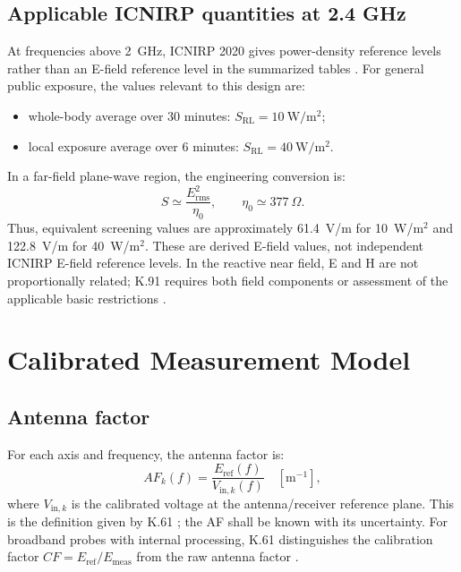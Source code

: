 \documentclass[11pt,a4paper]{article}
\begin{document}
\subsection{Applicable ICNIRP quantities at 2.4 GHz}
At frequencies above 2~GHz, ICNIRP 2020 gives power-density reference levels rather than an E-field reference level in the summarized tables \cite[Tables~5--6]{ICNIRP-2020}. For general public exposure, the values relevant to this design are:
\begin{itemize}
  \item whole-body average over 30 minutes: $S_{\mathrm{RL}}=10\ \mathrm{W/m^2}$;
  \item local exposure average over 6 minutes: $S_{\mathrm{RL}}=40\ \mathrm{W/m^2}$.
\end{itemize}

In a far-field plane-wave region, the engineering conversion is:
\begin{equation}
  S \simeq \frac{E_{\mathrm{rms}}^2}{\eta_0},
  \qquad \eta_0 \simeq 377\ \Omega .
  \label{eq:plane-wave}
\end{equation}
Thus, equivalent screening values are approximately 61.4~V/m for 10~W/m$^2$ and 122.8~V/m for 40~W/m$^2$. These are derived E-field values, not independent ICNIRP E-field reference levels. In the reactive near field, E and H are not proportionally related; K.91 requires both field components or assessment of the applicable basic restrictions \cite[Sec.~7.2.6]{ITU-T-K.91}.

\section{Calibrated Measurement Model}

\subsection{Antenna factor}
For each axis and frequency, the antenna factor is:
\begin{equation}
  AF_k(f)=\frac{E_{\mathrm{ref}}(f)}{V_{\mathrm{in},k}(f)}\quad [\mathrm{m^{-1}}],
  \label{eq:af}
\end{equation}
where $V_{\mathrm{in},k}$ is the calibrated voltage at the antenna/receiver reference plane. This is the definition given by K.61 \cite[Sec.~8.1.3.2]{ITU-T-K.61}; the AF shall be known with its uncertainty. For broadband probes with internal processing, K.61 distinguishes the calibration factor $CF=E_{\mathrm{ref}}/E_{\mathrm{meas}}$ from the raw antenna factor \cite[Sec.~8.1.3.1]{ITU-T-K.61}.
\end{document}
